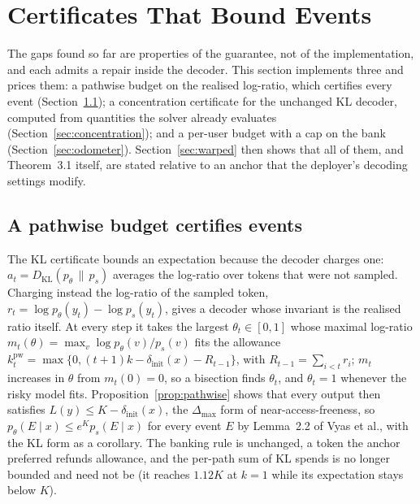 \section{Certificates That Bound Events}\label{sec:certificates}

The gaps found so far are properties of the guarantee, not of the implementation, and each admits a repair inside the decoder. This section implements three and prices them: a pathwise budget on the realised log-ratio, which certifies every event (Section~\ref{sec:pathwise}); a concentration certificate for the unchanged KL decoder, computed from quantities the solver already evaluates (Section~\ref{sec:concentration}); and a per-user budget with a cap on the bank (Section~\ref{sec:odometer}). Section~\ref{sec:warped} then shows that all of them, and Theorem~3.1 itself, are stated relative to an anchor that the deployer's decoding settings modify.

\subsection{A pathwise budget certifies events}\label{sec:pathwise}
The KL certificate bounds an expectation because the decoder charges one: $a_t = D_{\mathrm{KL}}(p_\theta \,\|\, p_s)$ averages the log-ratio over tokens that were not sampled. Charging instead the log-ratio of the sampled token, $r_t = \log p_\theta(y_t) - \log p_s(y_t)$, gives a decoder whose invariant is the realised ratio itself. At every step it takes the largest $\theta_t \in [0, 1]$ whose maximal log-ratio $m_t(\theta) = \max_v \log p_\theta(v)/p_s(v)$ fits the allowance $k^{\mathrm{pw}}_t = \max\{0, (t+1)k - \delta_{\mathrm{init}}(x) - R_{t-1}\}$, with $R_{t-1} = \sum_{i < t} r_i$; $m_t$ increases in $\theta$ from $m_t(0) = 0$, so a bisection finds $\theta_t$, and $\theta_t = 1$ whenever the risky model fits. Proposition~\ref{prop:pathwise} shows that every output then satisfies $L(y) \le K - \delta_{\mathrm{init}}(x)$, the $\Delta_{\max}$ form of near-access-freeness, so $p_\theta(E \mid x) \le e^{K} p_s(E \mid x)$ for every event $E$ by Lemma~2.2 of Vyas et al., with the KL form as a corollary. The banking rule is unchanged, a token the anchor preferred refunds allowance, and the per-path sum of KL spends is no longer bounded and need not be (it reaches $1.12K$ at $k=1$ while its expectation stays below $K$).

